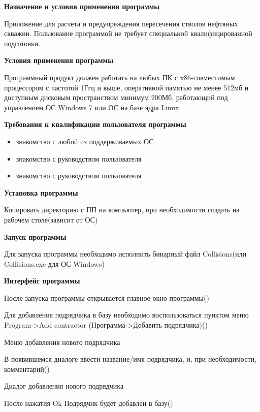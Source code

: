 \textbf{Назначение и условия применения программы}

Приложение для расчета и предупреждения пересечения стволов нефтяных скважин.
Пользование программой не требует специальной квалифицированной  подготовки.

\textbf{Условия применения программы}

Программный продукт должен работать на любых ПК с x86-совместимым процессором с частотой 1Ггц и выше,
оперативной памятью не менее 512мб и доступным дисковым пространством минимум 200Мб, работающий под
управлением ОС Windows 7 или ОС на базе ядра Linux.

\textbf{Требования к квалификации пользователя программы}

\begin{itemize}
  \item{знакомство с любой из поддерживаемых ОС}
  \item{знакомство с руководством пользователя}
  \item{знакомство с руководством пользователя}
\end{itemize}

\textbf{Установка программы}

Копировать директорию с ПП на компьютер, при необходимости создать на рабочем столе(зависит от ОС)

\textbf{Запуск программы}

Для запуска программы необходимо исполнить бинарный файл Collisions(или Collisions.exe для ОС Windows)

\textbf{Интерфейс программы}

После запуска программы открывается главное окно программы()


Для добавления подрядчика в базу необходимо воспользоваться пунктом меню Program->Add contractor
(Программа->Добавить подрядчика)()

{Меню добавления нового подрядчика}

В появившемся диалоге ввести название/имя подрядчика, и, при необходимости, комментарий()

{Диалог добавления нового подрядчика}

После нажатия Ok Подрядчик будет добавлен в базу()

